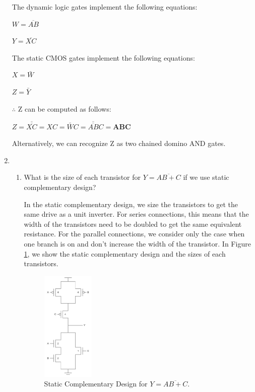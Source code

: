 \documentclass[fleqn]{article}
\begin{document}
\begin{enumerate}
			The dynamic logic gates implement the following equations:
			
			$W = \overline{AB}$
			
			$Y = \overline{XC}$
			
			The static CMOS gates implement the following equations:
			
			$X = \bar{W}$
			
			$Z = \bar{Y}$
			
			$\therefore$ Z can be computed as follows:
			
			$Z = \overline{\overline{XC}} = XC = \bar{W}C = \overline{\overline{AB}}C = \mathbf{ABC}$
			
			Alternatively, we can recognize Z as two chained domino AND gates.
			
		\item ~
		
			\begin{enumerate}
			
			\item[1.] What is the size of each transistor for $Y = \overline{AB + C}$ if we use static complementary design?
			
			In the static complementary design, we size the transistors to get the same drive as a unit inverter. For series connections, this means that the width of the transistors need to be doubled to get the same equivalent resistance. For the parallel connections, we consider only the case when one branch is on and don't increase the width of the transistor. In Figure \ref{fig::circuit4a}, we show the static complementary design and the sizes of each transistors.
			
			\begin{figure}[H]
				\centerline{\includegraphics[width=0.25\textwidth]{circuit4a.png}}
				\caption{Static Complementary Design for $Y = \overline{AB + C}$.}
				\label{fig::circuit4a}
			\end{figure}
			

\end{enumerate}
\end{enumerate}
\end{document}
